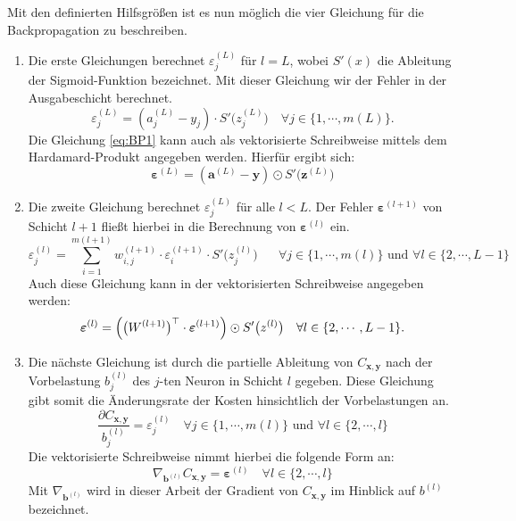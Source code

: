 \noindent
Mit den definierten Hilfsgrößen ist es nun möglich die vier Gleichung für die Backpropagation zu beschreiben. 
 
\begin{enumerate}
\item Die erste Gleichungen berechnet $\varepsilon^{(L)}_j$ für $l=L$, wobei $S'(x)$ die Ableitung der Sigmoid-Funktion bezeichnet. Mit dieser Gleichung wir der Fehler in der Ausgabeschicht berechnet.
\begin{equation}
	\label{eq:BP1}
	\varepsilon^{(L)}_j = (a_j^{(L)} - y_j) \cdot S'\bigl(z_j^{(L)}\bigr)
	\quad \mbox{$\forall j \in \{1, \cdots, m(L)\}$}.
\end{equation}
Die Gleichung \ref{eq:BP1} kann auch als vektorisierte Schreibweise mittels dem Hardamard-Produkt angegeben werden. Hierfür ergibt sich:
\begin{equation}
  \label{eq:BP1s}
\boldsymbol{\varepsilon}^{(L)} = (\mathbf{a}^{(L)} - \mathbf{y}) \odot S'\bigl(\mathbf{z}^{(L)}\bigr)  
\end{equation}
    
\item Die zweite Gleichung berechnet $\varepsilon^{(L)}_j$ für alle $l<L$. Der Fehler $\boldsymbol{\varepsilon}^{(l+1)}$ von Schicht $l+1$ fließt hierbei in die Berechnung von $\boldsymbol{\varepsilon}^{(l)}$ ein.
\begin{equation}
	\label{eq:BP2}
	\varepsilon^{(l)}_j = \sum\limits_{i=1}^{m(l+1)} w_{i,j}^{(l+1)} \cdot 			\varepsilon^{(l+1)}_i \cdot S'\bigl(z^{(l)}_j\bigr) \quad \mbox{ $\forall j \in \{1, \cdots, m(l)\}$ und $\forall l \in \{2, \cdots, L-1\}$}
\end{equation}
Auch diese Gleichung kann in der vektorisierten Schreibweise angegeben werden:
\begin{equation}
  \label{eq:BP2v}
  \boldsymbol{\varepsilon}^{(l)} = \Bigl(\bigl(W^{(l+1)}\bigr)^\top \cdot \boldsymbol{\varepsilon}^{(l+1)}\Bigr) \odot
  S'\bigl(z^{(l)}\bigr) \quad \mbox{$\forall l \in \{2, \cdots, L-1\}$}.
\end{equation}

\item Die nächste Gleichung ist durch die partielle Ableitung von $C_{\mathbf{x},\mathbf{y}}$ nach der Vorbelastung $b_j^{(l)}$ des $j$-ten Neuron in Schicht $l$ gegeben. Diese Gleichung gibt somit die Änderungsrate der Kosten hinsichtlich der Vorbelastungen an.
\begin{equation}
  \label{eq:BP3}
  \frac{\partial C_{\mathbf{x}, \mathbf{y}}}{b_j^{(l)}} = \varepsilon_j^{(l)}
  \quad \mbox{$\forall j \in \{1,\cdots,m(l)\}$ und $\forall l \in \{2, \cdots,l\}$}
\end{equation}
Die vektorisierte Schreibweise nimmt hierbei die folgende Form an:
\begin{equation}
  \label{eq:BP3v}
  \nabla_{\mathbf{b}^{(l)}} C_{\mathbf{x}, \mathbf{y}} = \boldsymbol{\varepsilon}^{(l)}
  \quad \mbox{$\forall l \in \{2, \cdots,l\}$}
\end{equation}
Mit $\nabla_{\mathbf{b}^{(l)}}$ wird in dieser Arbeit der Gradient von $C_{\mathbf{x},\mathbf{y}}$ im Hinblick auf $b^{(l)}$ bezeichnet. 


\end{enumerate}
